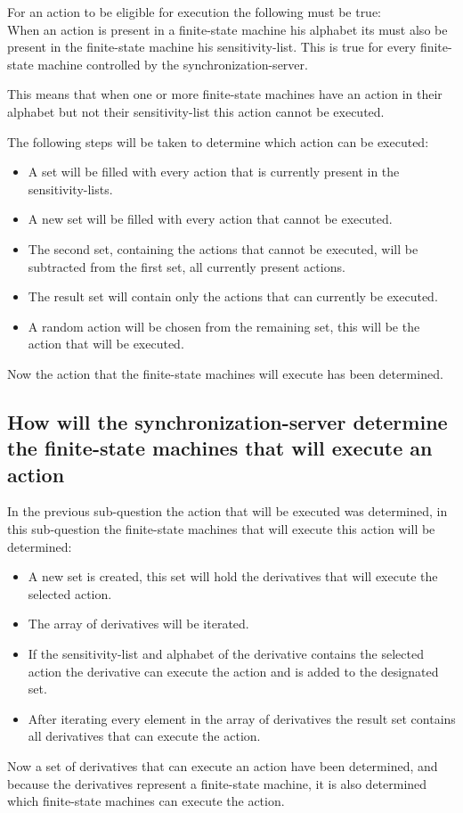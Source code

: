 For an action to be eligible for execution the following must be true:\\
When an action is present in a finite-state machine his alphabet its
must also be present in the finite-state machine his sensitivity-list.
This is true for every finite-state machine controlled by the
synchronization-server.

This means that when one or more finite-state machines have an action in
their alphabet but not their sensitivity-list this action cannot be
executed.

The following steps will be taken to determine which action can be
executed:

\begin{itemize}
\tightlist
\item
  A set will be filled with every action that is currently present in
  the sensitivity-lists.
\item
  A new set will be filled with every action that cannot be executed.
\item
  The second set, containing the actions that cannot be executed, will
  be subtracted from the first set, all currently present actions.
\item
  The result set will contain only the actions that can currently be
  executed.
\item
  A random action will be chosen from the remaining set, this will be
  the action that will be executed.
\end{itemize}

Now the action that the finite-state machines will execute has been
determined.

\hypertarget{how-will-the-synchronization-server-determine-the-finite-state-machines-that-will-execute-an-action}{%
\subsection{How will the synchronization-server determine the
finite-state machines that will execute an
action}\label{how-will-the-synchronization-server-determine-the-finite-state-machines-that-will-execute-an-action}}

In the previous sub-question the action that will be executed was
determined, in this sub-question the finite-state machines that will
execute this action will be determined:

\begin{itemize}
\tightlist
\item
  A new set is created, this set will hold the derivatives that will
  execute the selected action.
\item
  The array of derivatives will be iterated.
\item
  If the sensitivity-list and alphabet of the derivative contains the
  selected action the derivative can execute the action and is added to
  the designated set.
\item
  After iterating every element in the array of derivatives the result
  set contains all derivatives that can execute the action.
\end{itemize}

Now a set of derivatives that can execute an action have been
determined, and because the derivatives represent a finite-state
machine, it is also determined which finite-state machines can execute
the action.

